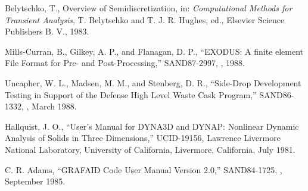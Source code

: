\begin{thebibliography}{99}
\frenchspacing

 Belytschko, T., Overview of Semidiscretization, in: {\it
Computational Methods for Transient Analysis}, T. Belytschko and T. J.
R. Hughes, ed., Elsevier Science Publishers B. V., 1983.

 Mills-Curran, B., Gilkey, A. P., and Flanagan, D. P.,
``EXODUS: A finite element File Format for Pre- and Post-Processing,''
 SAND87-2997, \SANDIA, 1988.

 Uncapher, W. L., Madsen, M. M., and Stenberg, D. R.,
``Side-Drop Development Testing in Support of the Defense High Level
Waste Cask Program,'' SAND86-1332, \SANDIA, March 1988.

 Hallquist, J. O.,
``User's Manual for DYNA3D and DYNAP: Nonlinear
Dynamic Analysis of Solids in Three Dimensions,'' UCID-19156, Lawrence
Livermore National Laboratory, University of California, Livermore,
California, July 1981.

  C. R. Adams,
``GRAFAID Code User Manual Version 2.0,'' SAND84-1725, \SANDIA,
September 1985.

\end{thebibliography}
